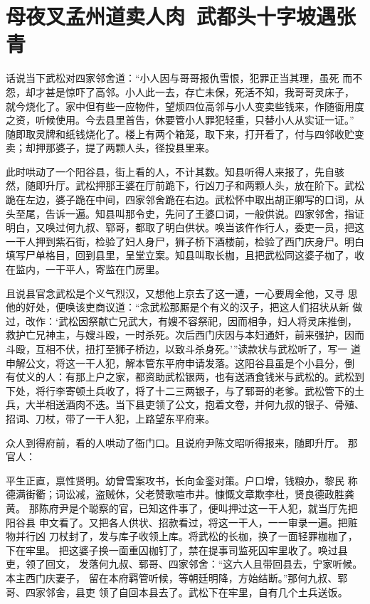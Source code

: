 \chapter{母夜叉孟州道卖人肉~武都头十字坡遇张青}

话说当下武松对四家邻舍道：“小人因与哥哥报仇雪恨，犯罪正当其理，虽死
而不怨，却才甚是惊吓了高邻。小人此一去，存亡未保，死活不知，我哥哥灵床子，
就今烧化了。家中但有些一应物件，望烦四位高邻与小人变卖些钱来，作随衙用度
之资，听候使用。今去县里首告，休要管小人罪犯轻重，只替小人从实证一证。”
随即取灵牌和纸钱烧化了。楼上有两个箱笼，取下来，打开看了，付与四邻收贮变
卖；却押那婆子，提了两颗人头，径投县里来。

此时哄动了一个阳谷县，街上看的人，不计其数。知县听得人来报了，先自骇
然，随即升厅。武松押那王婆在厅前跪下，行凶刀子和两颗人头，放在阶下。武松
跪在左边，婆子跪在中间，四家邻舍跪在右边。武松怀中取出胡正卿写的口词，从
头至尾，告诉一遍。知县叫那令史，先问了王婆口词，一般供说。四家邻舍，指证
明白，又唤过何九叔、郓哥，都取了明白供状。唤当该仵作行人，委吏一员，把这
一干人押到紫石街，检验了妇人身尸，狮子桥下酒楼前，检验了西门庆身尸。明白
填写尸单格目，回到县里，呈堂立案。知县叫取长枷，且把武松同这婆子枷了，收
在监内，一干平人，寄监在门房里。

且说县官念武松是个义气烈汉，又想他上京去了这一遭，一心要周全他，又寻
思他的好处，便唤该吏商议道：“念武松那厮是个有义的汉子，把这人们招状从新
做过，改作：‘武松因祭献亡兄武大，有嫂不容祭祀，因而相争，妇人将灵床推倒，
救护亡兄神主，与嫂斗殴，一时杀死。次后西门庆因与本妇通奸，前来强护，因而
斗殴，互相不伏，扭打至狮子桥边，以致斗杀身死。’”读款状与武松听了，写一
道申解公文，将这一干人犯，解本管东平府申请发落。这阳谷县虽是个小县分，倒
有仗义的人：有那上户之家，都资助武松银两，也有送酒食钱米与武松的。武松到
下处，将行李寄顿土兵收了，将了十二三两银子，与了郓哥的老爹。武松管下的土
兵，大半相送酒肉不迭。当下县吏领了公文，抱着文卷，并何九叔的银子、骨殖、
招词、刀杖，带了一干人犯，上路望东平府来。

众人到得府前，看的人哄动了衙门口。且说府尹陈文昭听得报来，随即升厅。
那官人：

平生正直，禀性贤明。幼曾雪案攻书，长向金銮对策。户口增，钱粮办，黎民
称德满街衢；词讼减，盗贼休，父老赞歌喧市井。慷慨文章欺李杜，贤良德政胜龚
黄。
那陈府尹是个聪察的官，已知这件事了，便叫押过这一干人犯，就当厅先把阳谷县
申文看了。又把各人供状、招款看过，将这一干人，一一审录一遍。把赃物并行凶
刀杖封了，发与库子收领上库。将武松的长枷，换了一面轻罪枷枷了，下在牢里。
把这婆子换一面重囚枷钉了，禁在提事司监死囚牢里收了。唤过县吏，领了回文，
发落何九叔、郓哥、四家邻舍：“这六人且带回县去，宁家听候。本主西门庆妻子，
留在本府羁管听候，等朝廷明降，方始结断。”那何九叔、郓哥、四家邻舍，县吏
领了自回本县去了。武松下在牢里，自有几个土兵送饭。

